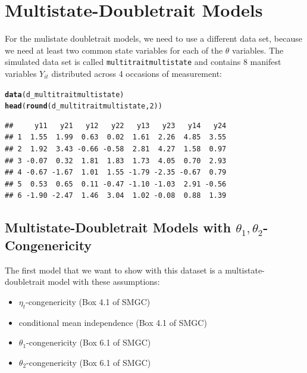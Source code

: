 \documentclass[10pt]{article}\usepackage[]{graphicx}\usepackage[]{xcolor}
\makeatletter
\newcommand{\hlnum}[1]{\textcolor[rgb]{0.686,0.059,0.569}{#1}}%
\newcommand{\hlstd}[1]{\textcolor[rgb]{0.345,0.345,0.345}{#1}}%
\newcommand{\hlkwd}[1]{\textcolor[rgb]{0.737,0.353,0.396}{\textbf{#1}}}%
\newenvironment{kframe}{%
 \def\at@end@of@kframe{}%
 \ifinner\ifhmode%
  \def\at@end@of@kframe{\end{minipage}}%
  \begin{minipage}{\columnwidth}%
 \fi\fi%
 \def\FrameCommand##1{\hskip\@totalleftmargin \hskip-\fboxsep
 \colorbox{shadecolor}{##1}\hskip-\fboxsep
     \hskip-\linewidth \hskip-\@totalleftmargin \hskip\columnwidth}%
 \MakeFramed {\advance\hsize-\width
   \@totalleftmargin\z@ \linewidth\hsize
   \@setminipage}}%
 {\par\unskip\endMakeFramed%
 \at@end@of@kframe}
\newenvironment{knitrout}{}{} %
\makeatother
\begin{document}
%



\newpage
\section{Multistate-Doubletrait Models}

For the mulistate doubletrait models, we need to use a different data set, because we need at least two common state variables for each of the $\theta$ variables. The simulated data set is called \texttt{multitraitmultistate} and contains 8 manifest variables $Y_{it}$ distributed across 4 occasions of measurement:

%
\begin{knitrout}
\color{fgcolor}\begin{kframe}
\begin{alltt}
\hlkwd{data}\hlstd{(d_multitraitmultistate)}
\hlkwd{head}\hlstd{(}\hlkwd{round}\hlstd{(d_multitraitmultistate,}\hlnum{2}\hlstd{))}
\end{alltt}
\begin{verbatim}
##     y11   y21   y12   y22   y13   y23   y14   y24
## 1  1.55  1.99  0.63  0.02  1.61  2.26  4.85  3.55
## 2  1.92  3.43 -0.66 -0.58  2.81  4.27  1.58  0.97
## 3 -0.07  0.32  1.81  1.83  1.73  4.05  0.70  2.93
## 4 -0.67 -1.67  1.01  1.55 -1.79 -2.35 -0.67  0.79
## 5  0.53  0.65  0.11 -0.47 -1.10 -1.03  2.91 -0.56
## 6 -1.90 -2.47  1.46  3.04  1.02 -0.08  0.88  1.39
\end{verbatim}
\end{kframe}
\end{knitrout}
%



\subsection{Multistate-Doubletrait Models with $\theta_1,\theta_2$-Congenericity}


The first model that we want to show with this dataset is a multistate-doubletrait model with these assumptions:
%
\begin{itemize}
  \item $\eta_t$-congenericity (Box 4.1 of SMGC)
  \item conditional mean independence (Box 4.1 of SMGC)
  \item $\theta_1$-congenericity (Box 6.1 of SMGC)
  \item $\theta_2$-congenericity (Box 6.1 of SMGC)
\end{itemize}
%
\end{document}
